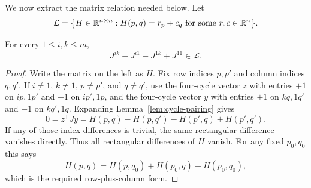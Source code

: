 We now extract the matrix relation needed below.  Let
\begin{equation}
 \label{eq:additive-space}
 \mathcal L=\bigl\{H\in\mathbb R^{n\times n}:
                H(p,q)=r_p+c_q\text{ for some }r,c\in\mathbb R^n\bigr\}.
\end{equation}

\begin{lemma}
\label{lem:additive}
For every $1\le i,k\le m$,
\begin{equation}
 \label{eq:additive-relation}
 J^{ik}-J^{i1}-J^{1k}+J^{11}\in\mathcal L.
\end{equation}
\end{lemma}

\begin{proof}
Write the matrix on the left as $H$.  Fix row indices $p,p'$ and
column indices $q,q'$.  If $i\ne1$, $k\ne1$, $p\ne p'$, and $q\ne q'$,
use the four-cycle vector $z$ with entries $+1$ on $ip,1p'$ and
$-1$ on $ip',1p$, and the four-cycle vector $y$ with entries $+1$
on $kq,1q'$ and $-1$ on $kq',1q$.  Expanding
Lemma~\ref{lem:cycle-pairing} gives
\[
 0=z^{\mathsf T}Jy
   =H(p,q)-H(p,q')-H(p',q)+H(p',q').
\]
If any of those index differences is trivial, the same rectangular
difference vanishes directly.  Thus all rectangular differences of
$H$ vanish.  For any fixed $p_0,q_0$ this says
\[
 H(p,q)=H(p,q_0)+H(p_0,q)-H(p_0,q_0),
\]
which is the required row-plus-column form.
\end{proof}
